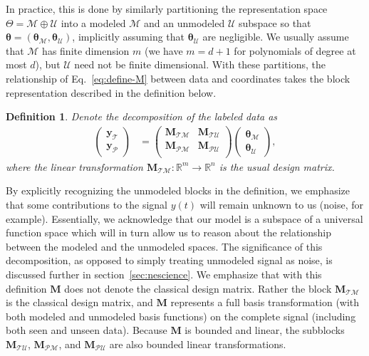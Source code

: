 \documentclass[twocolumn,aps,prx,superscriptaddress,10pt]{revtex4-2}
\newcommand{\by}{\bm{y}}
\newcommand{\0}{\bm{0}}
\newcommand{\btheta}{\boldsymbol{\theta}}
\newcommand{\M}{\mathcal{M}} %
\newcommand{\V}{\mathcal{P}} %
\newcommand{\T}{\mathcal{T}} %
\newcommand{\U}{\mathcal{U}} %
\newcommand{\bbM}{\mathbf{M}}
\newcommand{\MTM}{\bbM_{\T\M}}
\newcommand{\MTU}{\bbM_{\T\U}}
\newcommand{\MVM}{\bbM_{\V\M}}
\newcommand{\MVU}{\bbM_{\V\U}}
\newcommand{\R}{\mathbb{R}}
\newtheorem*{definition}{Definition}
\begin{document}
In practice, this is done by similarly partitioning the representation space $\Theta = \M \oplus \U$ into a modeled $\M$ and an unmodeled $\U$ subspace  so that $\btheta = (\btheta_\M, \btheta_\U)$, implicitly assuming that $\btheta_\U$ are negligible.  We usually assume that $\M$ has finite dimension $m$ (we have $m = d+1$ for polynomials of degree at most $d$), but $\U$ need not be finite dimensional. 
With these partitions, the relationship of Eq.~\eqref{eq:define-M} between data and coordinates takes the block representation described in the definition below.
\begin{definition}
Denote the decomposition of the labeled data as
\begin{align}
  \label{eq:partition}
  \left(
  \begin{array}{c}
    \by_\T \\
    \by_\V
  \end{array}
  \right) & =
            \left(
            \begin{array}{cc}
              \MTM & \MTU \\
              \MVM & \MVU \\
            \end{array}
            \right)            
  \left(
    \begin{array}{c}
    \btheta_\M \\
    \btheta_\U
  \end{array}
  \right),
\end{align}
where the linear transformation $\MTM:\R^m \to \R^n$ is the usual \emph{design matrix}.
\end{definition}

By explicitly recognizing the unmodeled blocks in the definition, we emphasize that some contributions to the signal $y(t)$ will remain unknown to us (noise, for example).
Essentially, we acknowledge that our model is a subspace of a universal function space which will in turn allow us to reason about the relationship between the modeled and the unmodeled spaces.  
The significance of this decomposition, as opposed to simply treating unmodeled signal as noise, is discussed further in section~\ref{sec:nescience}.
We emphasize that with this definition $\bbM$ does not denote the classical design matrix.  Rather the block $\MTM$ is the classical design matrix, and  $\bbM$  represents a full basis transformation (with both modeled and unmodeled basis functions) on the complete signal (including both seen and unseen data).
Because $\bbM$ is bounded and linear, the subblocks $\MTU$, $\MVM$, and $\MVU$ are also bounded linear transformations.
\end{document}
